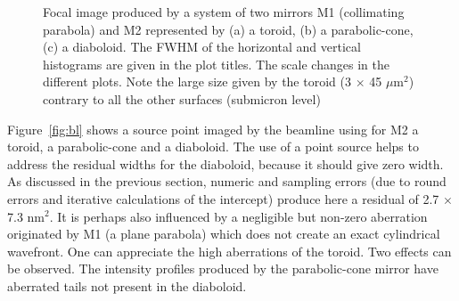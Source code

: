\documentclass{iucr}              %
\newcommand{\inred}[1]{{\color{red}#1}}
\begin{document}
\begin{figure}
\caption{Focal image produced by a system of two mirrors M1 (collimating parabola) and M2 represented by (a) a toroid, (b) a parabolic-cone, (c) a diaboloid. The FWHM of the horizontal and vertical histograms are given in the plot titles. The scale changes in the different plots. Note the large size given by the toroid (3 $\times$ 45 $\mu$m$^2$) contrary to all the other surfaces (submicron level)
}
\end{figure}

Figure~\ref{fig:bl} shows a source point imaged by the beamline using for M2 a toroid, a parabolic-cone and a diaboloid. The use of a point source helps to address the residual widths for the diaboloid, because it should give zero width. As discussed in the previous section, numeric and sampling errors (due to round errors and iterative calculations of the intercept) produce here a residual of 2.7 $\times$ 7.3 nm$^2$. \inred{It is perhaps also influenced by a negligible but non-zero aberration originated by M1 (a plane parabola) which does not create an exact cylindrical wavefront.}  One can appreciate the high aberrations of the toroid. Two effects can be observed. The intensity profiles produced by the parabolic-cone mirror have aberrated tails not present in the diaboloid.
\end{document}
